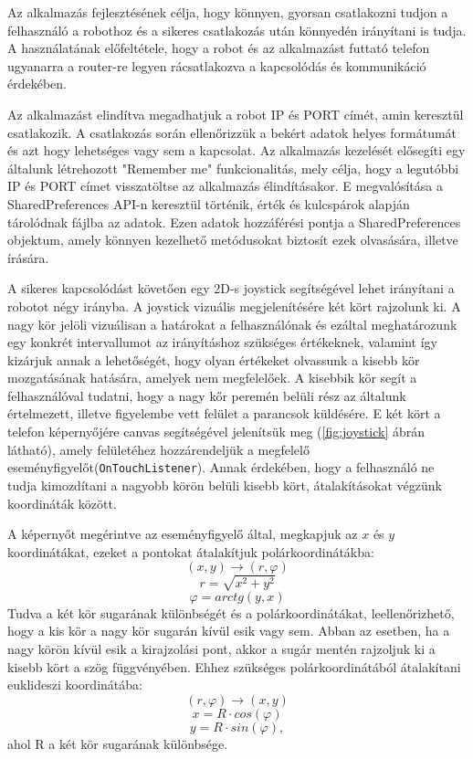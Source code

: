 Az alkalmazás fejlesztésének célja, hogy könnyen, gyorsan csatlakozni tudjon a felhasználó a robothoz és a sikeres csatlakozás után könnyedén irányítani is tudja. A használatának előfeltétele, hogy a robot és az alkalmazást futtató telefon ugyanarra a router-re legyen rácsatlakozva a kapcsolódás és kommunikáció érdekében. 

Az alkalmazást elindítva megadhatjuk a robot IP és PORT címét, amin keresztül csatlakozik. A csatlakozás során ellenőrizzük a bekért adatok helyes formátumát és azt hogy lehetséges vagy sem a kapcsolat. Az alkalmazás kezelését elősegíti egy általunk létrehozott "Remember me" funkcionalitás, mely célja, hogy a legutóbbi IP és PORT címet visszatöltse az alkalmazás élindításakor. E megvalósítása a SharedPreferences API-n keresztül történik, érték és kulcspárok alapján tárolódnak fájlba az adatok. Ezen adatok hozzáférési pontja a SharedPreferences objektum, amely könnyen kezelhető metódusokat biztosít ezek olvasására, illetve írására.

A sikeres kapcsolódást követően egy 2D-s joystick segítségével lehet irányítani a robotot négy irányba. A joystick vizuális megjelenítésére két kört rajzolunk ki. A nagy kör jelöli vizuálisan a határokat a felhasználónak és ezáltal meghatározunk egy konkrét intervallumot az irányításhoz szükséges értékeknek, valamint így kizárjuk annak a lehetőségét, hogy olyan értékeket olvassunk a kisebb kör mozgatásának hatására, amelyek nem megfelelőek. A kisebbik kör segít a felhasználóval tudatni, hogy a nagy kőr peremén belüli rész az általunk értelmezett, illetve figyelembe vett felület a parancsok küldésére. E két kört a telefon képernyőjére canvas segítségével jelenítsük meg (\ref{fig:joystick} ábrán látható), amely felületéhez hozzárendeljük a megfelelő eseményfigyelőt(\texttt{OnTouchListener}). Annak érdekében, hogy a felhasználó ne tudja kimozdítani a nagyobb körön belüli kisebb kört, átalakításokat végzünk koordináták között.

A képernyőt megérintve az eseményfigyelő által, megkapjuk az $x$ és $y$ koordinátákat, ezeket a pontokat átalakítjuk polárkoordinátákba: $$(x,y) \longrightarrow (r,\varphi)$$ $$r=\sqrt{x^2+y^2}$$ $$\varphi=arctg(y,x)$$ Tudva a két kör sugarának különbségét és a polárkoordinátákat, leellenőrizhető, hogy a kis kör a nagy kör sugarán kívül esik vagy sem. Abban az esetben, ha a nagy körön kívül esik a kirajzolási pont, akkor a sugár mentén rajzoljuk ki a kisebb kört a szög függvényében. Ehhez szükséges polárkoordinátából átalakítani euklideszi koordinátába:  $$(r,\varphi) \longrightarrow (x,y)$$ $$x=R\cdot cos(\varphi)$$ $$y=R\cdot sin(\varphi),$$ ahol R a két kör sugarának különbsége.

